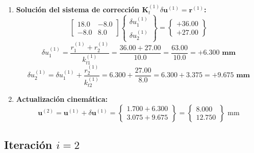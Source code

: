 \documentclass[11pt,letterpaper]{article}
\begin{document}
\begin{stepbox}
\begin{enumerate}
\[    \]
    \[
        \det(\mathbf{K}_t^{(1)}) = k_{t1}^{(1)} \cdot k_{t2}^{(1)} = 10.0 \times 8.0 = \mathbf{80.0}
    \]
    \textit{Comentario pedagógico:} Nótese la drástica reducción del determinante de $8000$ a $80$ (disminución del $99\%$), reflejo fiel de la pérdida de rigidez al plastificarse la estructura.
    \item \textbf{Solución del sistema de corrección $\mathbf{K}_t^{(1)} \delta \mathbf{u}^{(1)} = \mathbf{r}^{(1)}$:}
    \[
        \begin{bmatrix} 18.0 & -8.0 \\ -8.0 & 8.0 \end{bmatrix} \begin{Bmatrix} \delta u_1^{(1)} \\ \delta u_2^{(1)} \end{Bmatrix} = \begin{Bmatrix} +36.00 \\ +27.00 \end{Bmatrix}
    \]
    \[
        \delta u_1^{(1)} = \frac{r_1^{(1)} + r_2^{(1)}}{k_{t1}^{(1)}} = \frac{36.00 + 27.00}{10.0} = \frac{63.00}{10.0} = \mathbf{+6.300\text{ mm}}
    \]
    \[
        \delta u_2^{(1)} = \delta u_1^{(1)} + \frac{r_2^{(1)}}{k_{t2}^{(1)}} = 6.300 + \frac{27.00}{8.0} = 6.300 + 3.375 = \mathbf{+9.675\text{ mm}}
    \]
    \item \textbf{Actualización cinemática:}
    \[
        \mathbf{u}^{(2)} = \mathbf{u}^{(1)} + \delta \mathbf{u}^{(1)} = \begin{Bmatrix} 1.700 + 6.300 \\ 3.075 + 9.675 \end{Bmatrix} = \begin{Bmatrix} \mathbf{8.000} \\ \mathbf{12.750} \end{Bmatrix}\text{ mm}
    \]
\end{enumerate}
\end{stepbox}

\subsection{Iteración \texorpdfstring{$i = 2$}{i = 2}}
\end{document}
